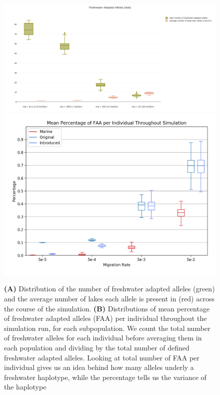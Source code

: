\documentclass{article}
\begin{document}
\begin{figure}
	\begin{center}
        \includegraphics[width=\linewidth]{plotlyPlots/NumFAA}
        \includegraphics[width=\linewidth]{matplotlibPlots/MPFAI}
  		\caption{
            \textbf{(A)}
            Distribution of the number of freshwater adapted alleles (green)
            and the average number of lakes each allele is present in (red)
            across the course of the simulation.
            \textbf{(B)}
            Distributions of mean percentage of freshwater adapted alleles (FAA) per individual throughout the simulation run, for each subpopulation.
		We count the total number of freshwater alleles for each individual before averaging them in each population and dividing by the total number of defined
		freshwater adapted alleles.
		Looking at total number of FAA per individual gives us an idea behind how many alleles underly a freshwater haplotype, 
		while the percentage tells us the variance of the haplotype}
		\label{fig:MPFAI}
	\end{center}
\end{figure}
\end{document}
